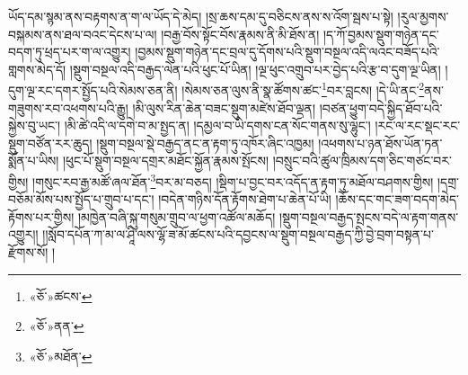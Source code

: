 ཡོད་དམ་སྙམ་ནས་བརྟགས་ན་ག་ལ་ཡོད་དེ་མེད། །སྲ་ཆས་དམ་དུ་བཅིངས་ནས་ས་འོག་སྦས་པ་སྟེ། །རུལ་མྱགས་བསྐམས་ནས་ཐལ་བའང་དེངས་པ་ལ། །བརྒྱ་བོས་སྟོང་བོས་རྣམས་ནི་མི་ཐོས་ན། །ད་ཀོ་བྱམས་སྡུག་གཉེན་དང་བདག་ཏུ་ཕྲད་པར་ག་ལ་འགྱུར། །བྱམས་སྡུག་གཉེན་དང་བྲལ་དུ་དོགས་པའི་སྡུག་བསྔལ་འདི་ལའང་བཟོད་པའི་གླགས་མེད་དོ། །སྡུག་བསྔལ་འདི་བརྒྱད་ལེན་པའི་ཕུང་པོ་ཡིན། །ལྔ་ཕུང་འགྲུབ་པར་བྱེད་པའི་རྩ་བ་དུག་ལྔ་ཡིན། །དུག་ལྔ་རང་དགར་སྤྱོད་པའི་སེམས་ཅན་ནི། །སེམས་ཅན་ལུས་ནི་སྣ་ཚོགས་ཚང་\footnote{«ཅོ་»ཚངས་}བར་བླངས། །དེ་ཡི་ནང་\footnote{«ཅོ་»ནན་}ནས་གཟུགས་རབ་འཕགས་པའི་རྒྱུ། །མི་ལུས་རིན་ཆེན་བཟང་སྡུག་མཛེས་ཐོབ་ལྡན། །བཙན་ཕྱུག་བདེ་སྐྱིད་ཐོབ་པའི་སྐྱེས་བུ་ཡང་། །མི་ཚེ་འདི་ལ་དགེ་བ་མ་སྤྱད་ན། །དམྱལ་བ་ཡི་དགས་ངན་སོང་གནས་སུ་ལྷུང་། །རང་ལ་རང་སྡང་རང་སྡུག་བཙོན་རར་ཆུད། །སྡུག་བསྔལ་སྡེ་བརྒྱད་ནང་ན་རྟག་ཏུ་འཁོར་ཞིང་འཁྱམ། །འཕགས་པ་ཉན་ཐོས་ཡོན་ཏན་སྨོན་པ་ཡིས། །ཕུང་པོ་སྡུག་བསྔལ་དགྲར་མཐོང་སྐྱོན་རྣམས་སྤོངས། །བསྲུང་བའི་ཚུལ་ཁྲིམས་དག་ཅིང་གཙང་བར་གྱིས། །གསུང་རབ་རྒྱ་མཚོ་ཞལ་ཐོན་\footnote{«ཅོ་»མཐོན་}བར་མ་བཅད། །སྡིག་པ་བྱང་བར་འདོད་ན་རྟག་ཏུ་མཐོལ་བཤགས་གྱིས། །དགྲ་བཅོམ་མོས་པས་སྤྱོད་པ་གྲུབ་པ་དང་། །བདེན་གཉིས་དོན་རྟོགས་ཐེག་པ་ཆེན་པོ་ཡི། །ཆོས་དང་གང་ཟག་བདག་མེད་རྟོགས་པར་གྱིས། །མཁྱེན་བཞི་སྐུ་གསུམ་གྲུབ་ལ་ཕྱག་འཚོལ་མཆོད། །སྡུག་བསྔལ་བརྒྱད་སྤངས་བདེ་ལ་རྟག་གནས་འགྱུར།། །།སློབ་དཔོན་ཀ་མ་ལ་ཤཱི་ལས་ལྷོ་ཟ་མོ་ཚངས་པའི་དབྱངས་ལ་སྡུག་བསྔལ་བརྒྱད་ཀྱི་བྱེ་བྲག་བསྟན་པ་རྫོགས་སོ། ། 